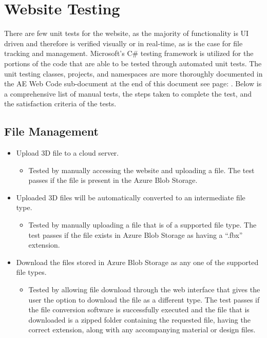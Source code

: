 
\section{Website Testing}
\tab There are few unit tests for the website, as the majority of functionality is UI driven and therefore is verified visually or in real-time, as is the case for file tracking and management. 
Microsoft's C\# testing framework is utilized for the portions of the code that are able to be tested through automated unit tests. 
The unit testing classes, projects, and namespaces are more thoroughly documented in the AE Web Code sub-document at the end of this document see page: \pageref{website_CodeDocumentation}.
Below is a comprehensive list of manual tests, the steps taken to complete the test, and the satisfaction criteria of the tests.

\subsection{File Management}
\begin{itemize}
    \item Upload 3D file to a cloud server.
    \begin{itemize}
        \item Tested by manually accessing the website and uploading a file. The test passes if the file is present in the Azure Blob Storage.
    \end{itemize}

    \item Uploaded 3D files will be automatically converted to an intermediate file type.
    \begin{itemize}
        \item Tested by manually uploading a file that is of a supported file type. The test passes if the file exists in Azure Blob Storage as having a ``.fbx'' extension.
    \end{itemize}

    \item Download the files stored in Azure Blob Storage as any one of the supported file types.
    \begin{itemize}
        \item Tested by allowing file download through the web interface that gives the user the option to download the file as a different type. The test passes if the file conversion software is successfully executed and the file that is downloaded is a zipped folder containing the requested file, having the correct extension, along with any accompanying material or design files.
    \end{itemize}

\end{itemize}


